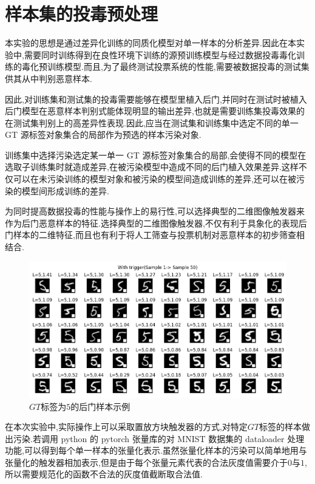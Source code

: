 \section{样本集的投毒预处理}

本实验的思想是通过差异化训练的同质化模型对单一样本的分析差异.因此在本实验中,需要同时训练得到在良性环境下训练的源预训练模型与经过数据投毒毒化训练的毒化预训练模型.而且,为了最终测试投票系统的性能,需要被数据投毒的测试集供其从中判别恶意样本.

因此,对训练集和测试集的投毒需要能够在模型里植入后门,并同时在测试时被植入后门模型在恶意样本判别式能体现明显的输出差异,也就是需要训练集投毒效果的在测试集判别上的高差异性表现.因此,应当在测试集和训练集中选定不同的单一 GT 源标签对象集合的局部作为预选的样本污染对象.

训练集中选择污染选定某一单一 GT 源标签对象集合的局部,会使得不同的模型在选取子训练集时就造成差异,在被污染模型中造成不同的后门植入效果差异.这样不仅可以在未污染训练的模型对象和被污染的模型间造成训练的差异,还可以在被污染的模型间形成训练的差异.

为同时提高数据投毒的性能与操作上的易行性,可以选择典型的二维图像触发器来作为后门恶意样本的特征.选择典型的二维图像触发器,不仅有利于具象化的表现后门样本的二维特征,而且也有利于将人工筛查与投票机制对恶意样本的初步筛查相结合.

\begin{figure}
	\centering
	\includegraphics[scale=0.5]{Figures/withtrigger.png}
	\caption{$GT$标签为$5$的后门样本示例}
\end{figure}

在本次实验中,实际操作上可以采取置放方块触发器的方式,对特定$GT$标签的样本做出污染.若调用 python 的 pytorch 张量库的对 MNIST 数据集的 dataloader 处理功能,可以得到每个单一样本的张量化表示.虽然张量化样本的污染可以简单地用与张量化的触发器相加表示,但是由于每个张量元素代表的合法灰度值需要介于$0$与$1$,所以需要规范化的函数不合法的灰度值截断取合法值.

